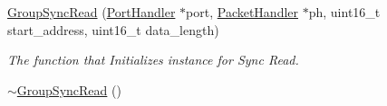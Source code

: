 \begin{DoxyCompactItemize}
\item 
\hyperlink{classmercury_1_1_group_sync_read_a6bdbf8d8bbff889a801d24dad6b68fac}{Group\+Sync\+Read} (\hyperlink{classmercury_1_1_port_handler}{Port\+Handler} $\ast$port, \hyperlink{classmercury_1_1_packet_handler}{Packet\+Handler} $\ast$ph, uint16\+\_\+t start\+\_\+address, uint16\+\_\+t data\+\_\+length)
\begin{DoxyCompactList}\small\item\em The function that Initializes instance for Sync Read. \end{DoxyCompactList}\item 
\hyperlink{classmercury_1_1_group_sync_read_af4336e4edfd6b9291709cb60a5a0d321}{$\sim$\+Group\+Sync\+Read} ()\hypertarget{classmercury_1_1_group_sync_read_af4336e4edfd6b9291709cb60a5a0d321}{}\label{classmercury_1_1_group_sync_read_af4336e4edfd6b9291709cb60a5a0d321}


\end{DoxyCompactItemize}
